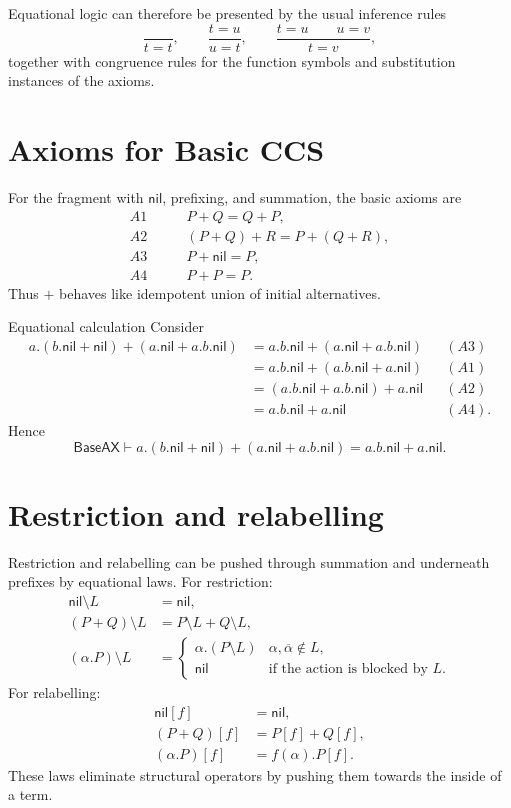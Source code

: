 \documentclass[a4paper]{article}
\newcommand{\nil}{\mathsf{nil}}
\begin{document}
Equational logic can therefore be presented by the usual inference rules
\[
    \frac{}{t=t},
    \qquad
    \frac{t=u}{u=t},
    \qquad
    \frac{t=u\qquad u=v}{t=v},
\]
together with congruence rules for the function symbols and substitution instances of the axioms.

\section{Axioms for Basic CCS}

For the fragment with \(\nil\), prefixing, and summation, the basic axioms are
\begin{align*}
    A1\qquad& P+Q = Q+P,\\
    A2\qquad& (P+Q)+R = P+(Q+R),\\
    A3\qquad& P+\nil = P,\\
    A4\qquad& P+P = P.
\end{align*}
Thus \(+\) behaves like idempotent union of initial alternatives.

\begin{snippetexample}{Equational calculation}
    Consider
    \begin{align*}
        a.(b.\nil+\nil)+(a.\nil+a.b.\nil)
        &=a.b.\nil+(a.\nil+a.b.\nil) && (A3)\\
        &=a.b.\nil+(a.b.\nil+a.\nil) && (A1)\\
        &=(a.b.\nil+a.b.\nil)+a.\nil && (A2)\\
        &=a.b.\nil+a.\nil && (A4).
    \end{align*}
    Hence
    \[
        \mathsf{BaseAX}\vdash
        a.(b.\nil+\nil)+(a.\nil+a.b.\nil)
        =a.b.\nil+a.\nil.
    \]
\end{snippetexample}

\section{Restriction and relabelling}

Restriction and relabelling can be pushed through summation and underneath prefixes by equational laws.
For restriction:
\begin{align*}
    \nil\setminus L &= \nil,\\
    (P+Q)\setminus L &= P\setminus L+Q\setminus L,\\
    (\alpha.P)\setminus L
    &=
    \begin{cases}
        \alpha.(P\setminus L) & \alpha,\overline\alpha\notin L,\\
        \nil & \text{if the action is blocked by \(L\)}.
    \end{cases}
\end{align*}
For relabelling:
\begin{align*}
    \nil[f]&=\nil,\\
    (P+Q)[f]&=P[f]+Q[f],\\
    (\alpha.P)[f]&=f(\alpha).P[f].
\end{align*}
These laws eliminate structural operators by pushing them towards the inside of a term.
\end{document}
